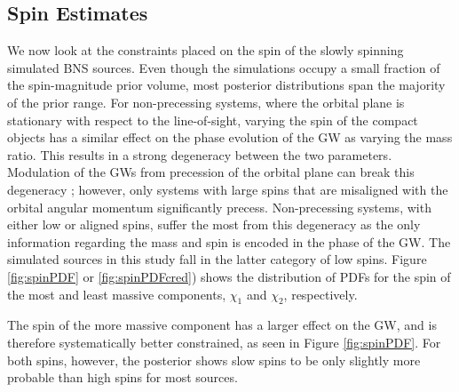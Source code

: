 \subsection{Spin Estimates}\label{sec:spin-magnitudes}
We now look at the constraints placed on the spin of the slowly spinning simulated BNS sources.  Even though the simulations occupy a small fraction of the spin-magnitude prior volume, most posterior distributions span the majority of the prior range. For non-precessing systems, where the orbital plane is stationary with respect to the line-of-sight, varying the spin of the compact objects has a similar effect on the phase evolution of the GW as varying the mass ratio. This results in a strong degeneracy between the two parameters.  Modulation of the GWs from precession of the orbital plane can break this degeneracy \citep{Vecchio_2004,Lang_2006,Vitale_2014,Chatziioannou_2014}; however, only systems with large spins that are misaligned with the orbital angular momentum significantly precess. Non-precessing systems, with either low or aligned spins, suffer the most from this degeneracy as the only information regarding the mass and spin is encoded in the phase of the GW.  The simulated sources in this study fall in the latter category of low spins.  Figure \ref{fig:spinPDF} or \ref{fig:spinPDFcred}) shows the distribution of PDFs for the spin of the most and least massive components, $\chi_1$ and $\chi_2$, respectively.

The spin of the more massive component has a larger effect on the GW, and is therefore systematically better constrained, as seen in Figure \ref{fig:spinPDF}.  For both spins, however, the posterior shows slow spins to be only slightly more probable than high spins for most sources.
  
  
  
  
  